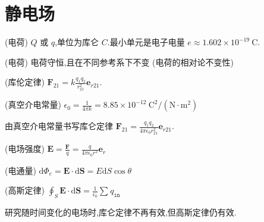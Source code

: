 
\usepackage{../../lectures_preamble}


    \section{静电场}
    \begin{definition}
        (电荷) $Q$ 或 $q$,单位为库仑 $C$.最小单元是电子电量 $e\approx 1.602\times 10^{-19} \ \mathrm{C}$.
    \end{definition}
    \begin{theorem}
        (电荷) 电荷守恒,且在不同参考系下不变 (电荷的相对论不变性)
    \end{theorem}
    \begin{theorem}
        (库伦定律) $\bm{F}_{21}=k \frac{q_1q_2}{r_{21}^2}\bm{e}_{r21}$.
    \end{theorem}
    \begin{definition}
        (真空介电常量) $\epsilon_0=\frac{1}{4\pi k}=8.85\times 10^{-12} \ \mathrm{C^2 / (N\cdot m^2)}$
    \end{definition}
    由真空介电常量书写库仑定律 $\bm{F}_{21}=\frac{q_1q_2}{4\pi \epsilon_0 r_{21}^2}\bm{e}_{r 21}$.
    \begin{definition}
        (电场强度) $\bm{E}=\frac{\bm{F}}{q}=\frac{q}{4\pi\epsilon_0 r^2}\bm{e}_{r}$
    \end{definition}
    \begin{definition}
        (电通量) $\mathrm{d}\Phi_{e}=\bm{E}\cdot \mathrm{d}\bm{S}=E\mathrm{d}S\cos \theta$
    \end{definition}
    \begin{theorem}
        (高斯定律) $\oint_{S}^{}\bm{E}\cdot \mathrm{d}\bm{S}=\frac{1}{\epsilon_0}\sum_{}^{}q_{\texttt{in}}$
    \end{theorem}
    研究随时间变化的电场时,库仑定律不再有效,但高斯定律仍有效.

